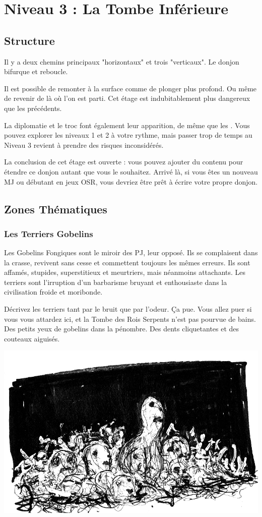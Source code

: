 \chapter{Niveau 3 : La Tombe Inférieure}\label{n3}
\section{Structure}
Il y a deux chemins principaux "horizontaux" et trois "verticaux".
Le donjon bifurque et reboucle.

Il est possible de remonter à la surface comme de plonger plus profond.
Ou même de revenir de là où l'on est parti.
Cet étage est indubitablement plus dangereux que les précédents.

La diplomatie et le troc font également leur apparition, de même que les .
Vous pouvez explorer les niveaux 1 et 2 à votre rythme, mais passer trop de temps au Niveau 3 revient à prendre des risques inconsidérés.

La conclusion de cet étage est ouverte : vous pouvez ajouter du contenu pour étendre ce donjon autant que vous le souhaitez.
Arrivé là, si vous êtes un nouveau MJ ou débutant en jeux OSR, vous devriez être prêt à écrire votre propre donjon.

\section{Zones Thématiques}
\subsection{Les Terriers Gobelins}
Les Gobelins Fongiques sont le miroir des PJ, leur opposé.
Ils se complaisent dans la crasse, revivent sans cesse et commettent toujours les mêmes erreurs.
Ils sont affamés, stupides, superstitieux et meurtriers, mais néanmoins attachants.
Les terriers sont l'irruption d'un barbarisme bruyant et enthousiaste dans la civilisation froide et moribonde.

Décrivez les terriers tant par le bruit que par l'odeur.
Ça pue.
Vous allez puer si vous vous attardez ici, et la Tombe des Rois Serpents n'est pas pourvue de bains.
Des petits yeux de gobelins dans la pénombre.
Des dents cliquetantes et des couteaux aiguisés.

\includegraphics[width=\columnwidth]{pics/goblin_pit.jpg}


